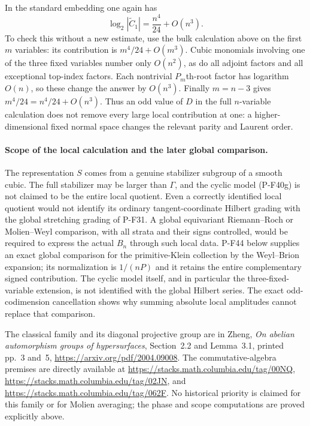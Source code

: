 In the standard embedding one again has
\[
                  \log_2|\widetilde C_1|
                             =\frac{n^4}{24}+O(n^3).
 \tag{P-F40o}
\]
To check this without a new estimate, use the bulk calculation
above on the first $m$ variables: its contribution is
$m^4/24+O(m^3)$. Cubic monomials involving one of the three
fixed variables number only $O(n^2)$, as do all adjoint
factors and all exceptional top-index factors. Each nontrivial
$P_m$th-root factor has logarithm $O(n)$, so these change the
answer by $O(n^3)$. Finally $m=n-3$ gives
$m^4/24=n^4/24+O(n^3)$.
Thus an odd value of $D$ in the full $n$-variable calculation does not remove every
large local contribution at one: a higher-dimensional fixed
normal space changes the relevant parity and Laurent order.

\paragraph{Scope of the local calculation and the later global comparison.}
The representation $S$ comes from a genuine stabilizer subgroup
of a smooth cubic. The full stabilizer may be larger than
$\Gamma$, and the cyclic model (P-F40g) is not claimed to be
the entire local quotient. Even a correctly identified local
quotient would not identify its ordinary tangent-coordinate
Hilbert grading with the global stretching grading of P-F31.
A global equivariant Riemann--Roch or Molien--Weyl comparison,
with all strata and their signs controlled, would be required
to express the actual $B_n$ through such local data.
P-F44 below supplies an exact global comparison for the
primitive-Klein collection by the Weyl--Brion expansion;
its normalization is $1/(nP)$ and it retains the entire
complementary signed contribution. The cyclic model itself,
and in particular the three-fixed-variable extension, is
not identified with the global Hilbert series. The exact
odd-codimension cancellation shows why summing absolute
local amplitudes cannot replace that comparison.

The classical family and its diagonal projective group are in
Zheng, \emph{On abelian automorphism groups of hypersurfaces},
Section~2.2 and Lemma~3.1, printed pp.~3 and~5,
\url{https://arxiv.org/pdf/2004.09008}.
The commutative-algebra premises are directly available at
\url{https://stacks.math.columbia.edu/tag/00NQ},
\url{https://stacks.math.columbia.edu/tag/02JN}, and
\url{https://stacks.math.columbia.edu/tag/062F}.
No historical priority is claimed for this family or for
Molien averaging; the phase and scope computations are
proved explicitly above.
